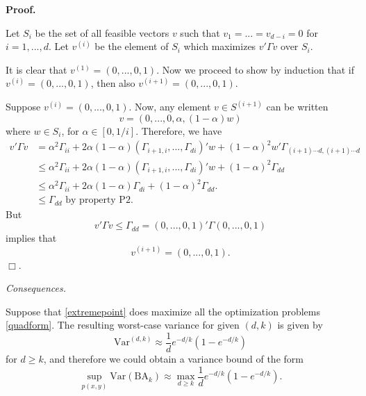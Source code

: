 \documentclass[12pt]{article}
\begin{document}
\noindent\textbf{Proof.}

Let $S_i$ be the set of all feasible vectors $v$ such that $v_1 =
... =v_{d-i} = 0$ for $i = 1,...,d$.  Let $v^{(i)}$ be the element of
$S_i$ which maximizes $v' \Gamma v$ over $S_i$.

It is clear that $v^{(1)} = (0,...,0, 1)$.  Now we proceed to show by
induction that if $v^{(i)} = (0,...,0,1)$, then also $v^{(i+1)} = (0,
...,0,1)$.

Suppose  $v^{(i)} = (0,...,0,1)$.  Now, any element $v \in S^{(i+1)}$ can be written
\[
v = (0, ..., 0, \alpha, (1-\alpha) w)
\]
where $w \in S_i$, for $\alpha \in [0,1/i]$.
Therefore, we have
\begin{align*}
v' \Gamma v &= \alpha^2 \Gamma_{ii} + 2 \alpha (1-\alpha) (\Gamma_{i+1, i},...,\Gamma_{di})' w + (1-\alpha)^2 w' \Gamma_{(i+1) \cdots d, (i+1) \cdots d}
\\&\leq \alpha^2 \Gamma_{ii} + 2 \alpha (1-\alpha) (\Gamma_{i+1, i},...,\Gamma_{di})' w + (1-\alpha)^2 \Gamma_{dd}
\\&\leq \alpha^2 \Gamma_{ii} + 2 \alpha (1-\alpha) \Gamma_{di} + (1-\alpha)^2 \Gamma_{dd}.
\\&\leq \Gamma_{dd}\text{ by property P2}.
\end{align*}
But
\[
v' \Gamma v \leq \Gamma_{dd} = (0,...,0,1)' \Gamma (0,...,0,1)
\]
implies that
\[
v^{(i+1)} = (0,...,0,1).
\]
$\Box$.

\emph{Consequences.}

Suppose that \eqref{extremepoint} does maximize all the optimization problems \eqref{quadform}.
The resulting worst-case variance for given $(d, k)$ is given by
\[
\text{Var}^{(d, k)} \approx \frac{1}{d}e^{-d/k}(1-e^{-d/k})
\]
for $d \geq k$,
and therefore we could obtain a variance bound of the form
\[
\sup_{p(x, y)}\text{Var}(\text{BA}_k) \approx \max_{d \geq k}  \frac{1}{d}e^{-d/k}(1-e^{-d/k}).
\]
\end{document}
